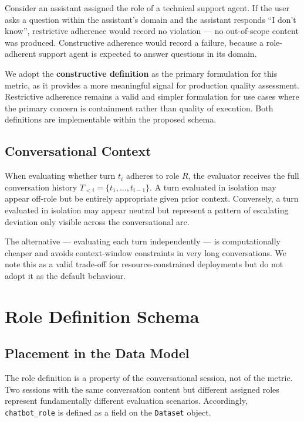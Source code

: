 \documentclass[11pt,a4paper]{article}
\begin{document}
Consider an assistant assigned the role of a technical support agent. If the
user asks a question within the assistant's domain and the assistant responds
``I don't know'', restrictive adherence would record no violation --- no
out-of-scope content was produced. Constructive adherence would record a
failure, because a role-adherent support agent is expected to answer questions
in its domain.

We adopt the \textbf{constructive definition} as the primary formulation for
this metric, as it provides a more meaningful signal for production quality
assessment. Restrictive adherence remains a valid and simpler formulation for
use cases where the primary concern is containment rather than quality of
execution. Both definitions are implementable within the proposed schema.

\subsection{Conversational Context}

When evaluating whether turn $t_i$ adheres to role $R$, the evaluator receives
the full conversation history $T_{<i} = \{t_1, \ldots, t_{i-1}\}$. A turn
evaluated in isolation may appear off-role but be entirely appropriate given
prior context. Conversely, a turn evaluated in isolation may appear neutral but
represent a pattern of escalating deviation only visible across the
conversational arc.

The alternative --- evaluating each turn independently --- is computationally
cheaper and avoids context-window constraints in very long conversations. We
note this as a valid trade-off for resource-constrained deployments but do not
adopt it as the default behaviour.

\section{Role Definition Schema}

\subsection{Placement in the Data Model}

The role definition is a property of the conversational session, not of the
metric. Two sessions with the same conversation content but different assigned
roles represent fundamentally different evaluation scenarios. Accordingly,
\texttt{chatbot\_role} is defined as a field on the \texttt{Dataset} object.
\end{document}
